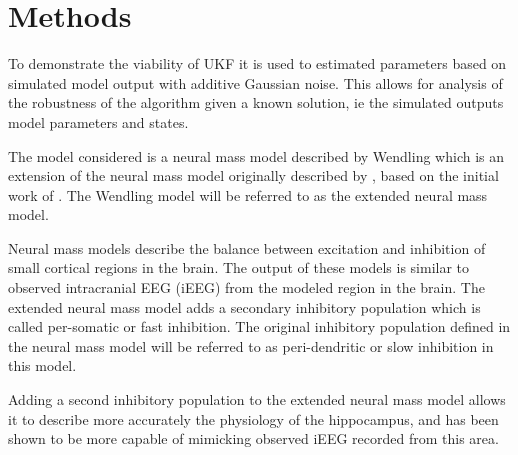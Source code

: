 \section{Methods}

To demonstrate the viability of UKF it is used to estimated parameters based on simulated model output with additive Gaussian noise. This allows for analysis of the robustness of the algorithm given a known solution, ie the simulated outputs model parameters and states.

The model considered is a neural mass model described by Wendling which is an extension of the neural mass model originally described by , based on the initial work of . The Wendling model will be referred to as the extended neural mass model. 

Neural mass models describe the balance between excitation and inhibition of small cortical regions in the brain. The output of these models is similar to observed intracranial EEG (iEEG) from the modeled region in the brain. The extended neural mass model adds a secondary inhibitory population which is called per-somatic or fast inhibition. The original inhibitory population defined in the neural mass model will be referred to as peri-dendritic or slow inhibition in this model.

Adding a second inhibitory population to the extended neural mass model allows it to describe more accurately the physiology of the hippocampus, and has been shown to be more capable of mimicking observed iEEG recorded from this area.

